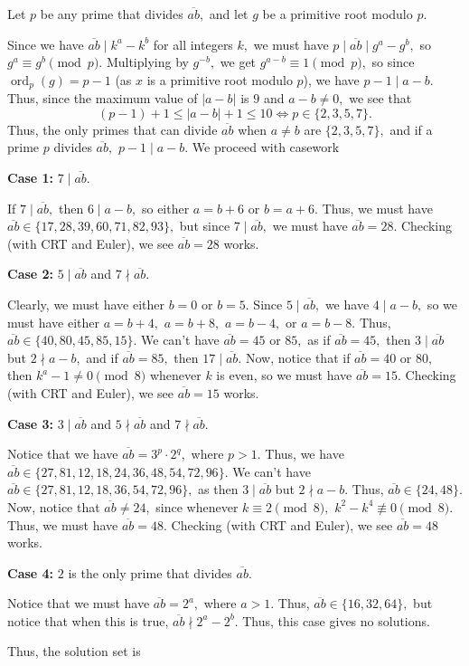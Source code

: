 \documentclass{article}
\begin{document}
\begin{sol}
Let $p$ be any prime that divides $\overline{ab},$ and let $g$ be a primitive root modulo $p.$

Since we have $\overline{ab} \mid k^a-k^b$ for all integers $k,$ we must have $p \mid \overline{ab} \mid g^a - g^b,$ so $g^a \equiv g^b \pmod{p}.$ Multiplying by $g^{-b},$ we get $g^{a-b} \equiv 1 \pmod{p},$ so since $\operatorname{ord}_p(g) = p-1$ (as $x$ is a primitive root modulo $p$), we have $p - 1 \mid a-b.$ Thus, since the maximum value of $|a-b|$ is $9$ and $a - b \neq 0,$ we see that  $$(p - 1)+1 \le |a-b|+1 \le 10 \Longleftrightarrow p \in \{2, 3, 5, 7\}.$$ Thus, the only primes that can divide $\overline{ab}$ when $a \neq b$ are $\{2, 3, 5, 7\},$ and if a prime $p$ divides $\overline{ab},$ $p-1 \mid a-b.$ We proceed with casework

\textbf{Case 1:} $7 \mid \overline{ab}.$

If $7 \mid \overline{ab},$ then $6 \mid a-b,$ so either $a = b+6$ or $b = a+6.$ Thus, we must have $\overline{ab} \in \{17, 28, 39, 60, 71, 82, 93\},$ but since $7 \mid \overline{ab},$ we must have $\overline{ab} = 28.$ Checking (with CRT and Euler), we see $\overline{ab} = 28$ works.

\textbf{Case 2:} $5 \mid \overline{ab}$ and $7 \nmid \overline{ab}.$

Clearly, we must have either $b = 0$ or $b = 5.$ Since $5 \mid \overline{ab},$ we have $4 \mid a-b,$ so we must have either $a = b+4,$ $a = b+8,$ $a = b-4,$ or $a = b-8.$ Thus, $\overline{ab} \in \{40, 80, 45, 85, 15\}.$ We can't have $\overline{ab} = 45$ or $85,$ as if $\overline{ab} = 45,$ then $3 \mid \overline{ab}$ but $2 \nmid a-b,$ and if $\overline{ab} = 85,$ then $17 \mid \overline{ab}.$ Now, notice that if $\overline{ab} = 40$ or $80,$ then $k^a - 1 \neq 0 \pmod{8}$ whenever $k$ is even, so we must have $\overline{ab} = 15.$ Checking (with CRT and Euler), we see $\overline{ab} = 15$ works.

\textbf{Case 3:} $3 \mid \overline{ab}$ and $5 \nmid \overline{ab}$ and $7 \nmid \overline{ab}.$

Notice that we have $\overline{ab} = 3^p \cdot 2^q,$ where $p>1.$ Thus, we have $\overline{ab} \in \{27, 81, 12, 18, 24, 36, 48, 54, 72, 96\}.$ We can't have $\overline{ab} \in \{27, 81, 12, 18, 36, 54, 72, 96\},$ as then $3 \mid \overline{ab}$ but $2 \nmid a-b.$ Thus, $\overline{ab} \in \{24, 48\}.$ Now, notice that $\overline{ab} \neq 24,$ since whenever $k \equiv 2 \pmod{8},$ $k^2 - k^4 \not\equiv 0 \pmod{8}.$ Thus, we must have $\overline{ab} = 48.$
Checking (with CRT and Euler), we see $\overline{ab} = 48$ works.

\textbf{Case 4:} $2$ is the only prime that divides $\overline{ab}.$

Notice that we must have $\overline{ab} = 2^a,$ where $a>1.$ Thus, $\overline{ab} \in \{16, 32, 64\},$ but notice that when this is true, $\overline{ab }\nmid 2^a-2^b.$ Thus, this case gives no solutions.

Thus, the solution set is 

\end{sol}
\end{document}
